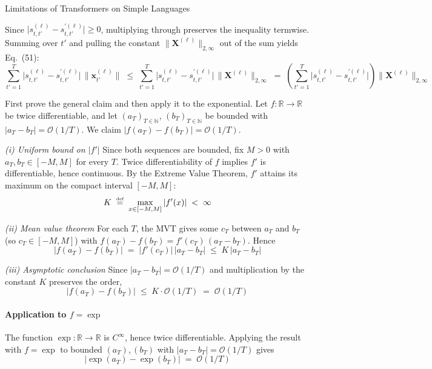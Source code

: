 \begin{question}{Limitations of Transformers on Simple Languages}
\begin{subquestion}
    Since $\bigl|s_{t,t'}^{(\ell)} - s_{t,t'}^{\prime(\ell)}\bigr| \ge 0$, multiplying through preserves the inequality termwise. 
    Summing over $t'$ and pulling the constant $\|\mathbf{X}^{(\ell)}\|_{2,\infty}$ out of the sum yields Eq.~(51):
    \begin{equation*}
        \sum_{t'=1}^{T} \bigl|s_{t,t'}^{(\ell)} - s_{t,t'}^{\prime(\ell)}\bigr|\, \|\mathbf{x}_{t'}^{(\ell)}\|
        \;\le\; \sum_{t'=1}^{T} \bigl|s_{t,t'}^{(\ell)} - s_{t,t'}^{\prime(\ell)}\bigr|\, \|\mathbf{X}^{(\ell)}\|_{2,\infty}
        \;=\; \!\left(\sum_{t'=1}^{T} \bigl|s_{t,t'}^{(\ell)} - s_{t,t'}^{\prime(\ell)}\bigr|\right)\!\|\mathbf{X}^{(\ell)}\|_{2,\infty}
    \end{equation*}
\end{subquestion}

\begin{subquestion}
    First prove the general claim and then apply it to the exponential. Let $f: \mathbb{R} \to \mathbb{R}$ be twice differentiable, and let $(a_T)_{T \in \mathbb{N}}$, $(b_T)_{T \in \mathbb{N}}$ be bounded with $|a_T - b_T| = \mathcal{O}(1/T)$. We claim $|f(a_T) - f(b_T)| = \mathcal{O}(1/T)$.

    \emph{(i) Uniform bound on $|f'|$} Since both sequences are bounded, fix $M > 0$ with $a_T, b_T \in [-M, M]$ for every $T$. Twice differentiability of $f$ implies $f'$ is differentiable, hence continuous. By the Extreme Value Theorem, $f'$ attains its maximum on the compact interval $[-M, M]$:
    \begin{equation*}
        K \;\mathrel{\stackrel{\textnormal{\tiny def}}{=}}\; \max_{x \in [-M, M]} |f'(x)| \;<\; \infty
    \end{equation*}

    \emph{(ii) Mean value theorem} For each $T$, the MVT gives some $c_T$ between $a_T$ and $b_T$ (so $c_T \in [-M, M]$) with $f(a_T) - f(b_T) = f'(c_T)\,(a_T - b_T)$. Hence
    \begin{equation*}
        |f(a_T) - f(b_T)| \;=\; |f'(c_T)|\, |a_T - b_T| \;\le\; K\, |a_T - b_T|
    \end{equation*}

    \emph{(iii) Asymptotic conclusion} Since $|a_T - b_T| = \mathcal{O}(1/T)$ and multiplication by the constant $K$ preserves the order,
    \begin{equation*}
        |f(a_T) - f(b_T)| \;\le\; K \cdot \mathcal{O}(1/T) \;=\; \mathcal{O}(1/T)
    \end{equation*}

    \paragraph{Application to $f = \exp$}
    The function $\exp: \mathbb{R} \to \mathbb{R}$ is $C^{\infty}$, hence twice differentiable. Applying the result with $f = \exp$ to bounded $(a_T), (b_T)$ with $|a_T - b_T| = \mathcal{O}(1/T)$ gives
    \begin{equation*}
        |\exp(a_T) - \exp(b_T)| \;=\; \mathcal{O}(1/T)
    \end{equation*}
\end{subquestion}


\end{question}
